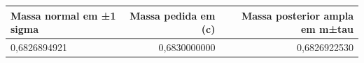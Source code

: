 \begin{tabular}{lrr}
\toprule
Massa normal em ±1 sigma & Massa pedida em (c) & Massa posterior ampla em m±tau \\
\midrule
0,6826894921 & 0,6830000000 & 0,6826922530 \\
\bottomrule
\end{tabular}

